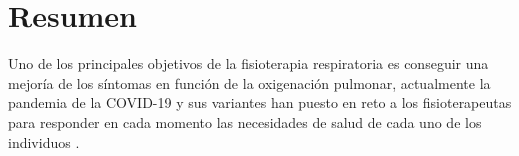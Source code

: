 \documentclass[12pt]{article}
\begin{document}


%


\clearpage\null\newpage


\clearpage\null\newpage









\clearpage\null\newpage


\section*{Resumen}

Uno de los principales objetivos de la fisioterapia respiratoria es conseguir una mejoría de los síntomas en función de la oxigenación pulmonar, actualmente la pandemia de la COVID-19 y sus variantes han puesto en reto a los fisioterapeutas para responder en cada momento las necesidades de salud de cada uno de los individuos \cite{28}. 
\end{document}
